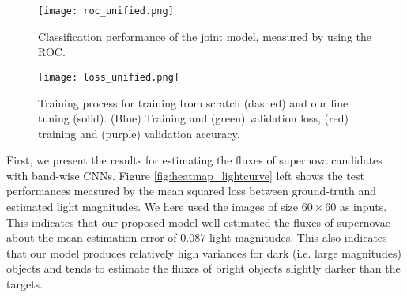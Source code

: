\documentclass[conference,compsoc]{IEEEtran}
\begin{document}
\begin{figure}[t]
  \begin{center}
    \texttt{[image: roc\_unified.png]}
  \end{center}
  \caption{%
    Classification performance of the joint model, measured by using the ROC.
  }
  \label{fig:roc_unified}
\end{figure}

\begin{figure}[t]
  \begin{center}
    \texttt{[image: loss\_unified.png]}
    \end{center}
  \caption{%
    Training process for training from scratch (dashed) and our fine tuning (solid).
    (Blue) Training and (green) validation loss, (red) training and (purple) validation accuracy.
  }
  \label{fig:loss_unified}
\end{figure}




  First, we present the results for estimating the fluxes of supernova candidates with band-wise CNNs.
  Figure \ref{fig:heatmap_lightcurve} left shows the test performances measured by the mean squared loss between ground-truth and estimated light magnitudes.
  We here used the images of size $60\times 60$ as inputs. 
  This indicates that our proposed model well estimated the fluxes of supernovae about the mean estimation error of $0.087$ light magnitudes.
  This also indicates that our model produces relatively high variances for dark (i.e. large magnitudes) objects and tends to estimate the fluxes of bright objects slightly darker than the targets.
\end{document}
